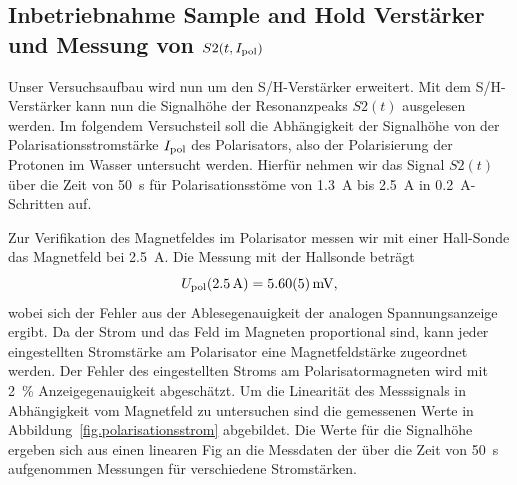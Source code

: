 \documentclass[paper=a4,
	fontsize=10pt,
	DIV=18,
	twocolumn,
	parskip=half
	]{scrartcl}
\numberwithin{equation}{section}    %
\begin{document}

\subsection{Inbetriebnahme Sample and Hold Verstärker und Messung von $S2(t,I_{\rm pol})$}
\label{auswertung4}

Unser Versuchsaufbau wird nun um den S/H-Verstärker erweitert. Mit dem S/H-Verstärker kann nun die Signalhöhe der Resonanzpeaks $S2(t)$ ausgelesen werden. Im folgendem Versuchsteil soll die Abhängigkeit der Signalhöhe von der Polarisationsstromstärke $I_{\rm pol}$ des Polarisators, also der Polarisierung der Protonen im Wasser untersucht werden. Hierfür nehmen wir das Signal $S2(t)$ über die Zeit von \SI{50}{\second} für Polarisationsstöme von \SI{1.3}{\ampere} bis \SI{2.5}{\ampere} in \SI{0.2}{\ampere}-Schritten auf.

Zur Verifikation des Magnetfeldes im Polarisator messen wir mit einer Hall-Sonde das Magnetfeld bei \SI{2.5}{\ampere}. Die Messung mit der Hallsonde beträgt
\begin{equation}
	U_{\rm pol}(\SI{2.5}{\ampere}) = \SI{5.60(5)}{\milli\volt},
\end{equation}
wobei sich der Fehler aus der Ablesegenauigkeit der analogen Spannungsanzeige ergibt. Da der Strom und das Feld im Magneten proportional sind, kann jeder eingestellten Stromstärke am Polarisator eine Magnetfeldstärke zugeordnet werden. Der Fehler des eingestellten Stroms am Polarisatormagneten wird mit \SI{2}{\percent} Anzeigegenauigkeit abgeschätzt.
Um die Linearität des Messsignals in Abhängigkeit vom Magnetfeld zu untersuchen sind die gemessenen Werte in Abbildung~\ref{fig.polarisationsstrom} abgebildet. Die Werte für die Signalhöhe ergeben sich aus einen linearen Fig an die Messdaten der über die Zeit von \SI{50}{\second} aufgenommen Messungen für verschiedene Stromstärken.
\end{document}
